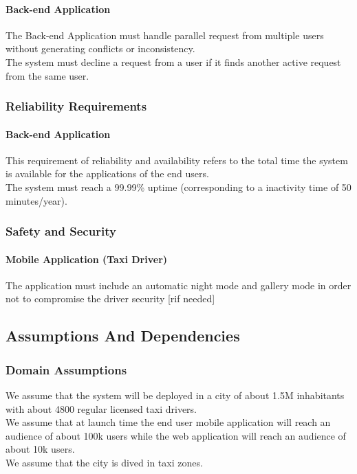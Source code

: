 \documentclass[12pt, a4paper]{article}
\begin{document}
\paragraph{Back-end Application} 
The Back-end Application must handle parallel request from multiple users without generating conflicts or inconsistency.\\
The system must decline a request from a user if it finds another active request from the same user.

\subsubsection{Reliability Requirements} 
\label{ssub:reliability_requirements}
\paragraph{Back-end Application} 
This requirement of reliability and availability refers to the total time the system is available for the applications of the end users.\\
The system must reach a 99.99\% uptime (corresponding to a inactivity time of 50 minutes/year).
\subsubsection{Safety and Security} 
\label{ssub:safety_and_security}
\paragraph{Mobile Application (Taxi Driver)} 
The application must include an automatic night mode and gallery mode in order not to compromise the driver security [rif needed]

\subsection{Assumptions And Dependencies} 
\label{sub:assumptions_and_dependencies}
\subsubsection{Domain Assumptions} 
\label{ssub:domain}
We assume that the system will be deployed in a city of about 1.5M inhabitants with about 4800 regular licensed taxi drivers.\\
We assume that at launch time the end user mobile application will reach an audience of about 100k users while the web application will reach an audience of about 10k users.\\
We assume that the city is dived in taxi zones.
\end{document}

